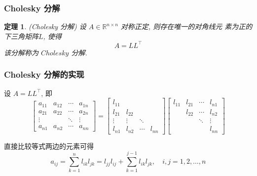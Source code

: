 \documentclass[notheorems,serif]{beamer}
\newcommand{\hei}[1]{{\HEI#1}}
\newtheorem{theorem}{\hei{定理}}
\begin{document}
\begin{frame}
\frametitle{Cholesky 分解}
\begin{theorem}(Cholesky 分解)
	设 $A ∈ \mathbb{R}^{n×n}$ 对称正定, 则存在唯一的对角线元
	素为正的下三角矩阵$ L$, 使得
	$$
	A=L L^{\top}
	$$
	该分解称为 $Cholesky$ 分解.	
\end{theorem}
\end{frame}

\begin{frame}
\frametitle{Cholesky 分解的实现}
设 $A = LL^{⊺}$, 即
\begin{equation}
\left[\begin{array}{cccc}{a_{11}} & {a_{12}} & {\cdots} & {a_{1 n}} \\ {a_{21}} & {a_{22}} & {\cdots} & {a_{2 n}} \\ {\vdots} & {} & {\ddots} & {\vdots} \\ {a_{n 1}} & {a_{n 2}} & {\cdots} & {a_{n n}}\end{array}\right]=\left[\begin{array}{cccc}{l_{11}} & {} & {} & {} \\ {l_{21}} & {l_{22}} & {} & {} \\ {\vdots} & {\vdots} & {\ddots} & {} \\ {l_{n 1}} & {l_{n 2}} & {\cdots} & {l_{n n}}\end{array}\right]\left[\begin{array}{cccc}{l_{11}} & {l_{21}} & {\cdots} & {l_{n 1}} \\ {} & {l_{22}} & {\cdots} & {l_{n 2}} \\{}& {} & {\ddots} & {\vdots} \\{} &{} & {} & {l_{n n}}\end{array}\right]
\end{equation}

直接比较等式两边的元素可得
\begin{equation}
a_{i j}=\sum_{k=1}^{n} l_{i k} l_{j k}=l_{j j} l_{i j}+\sum_{k=1}^{j-1} l_{i k} l_{j k}, \quad i, j=1,2, \ldots, n
\end{equation}
\end{frame}
\end{document}
